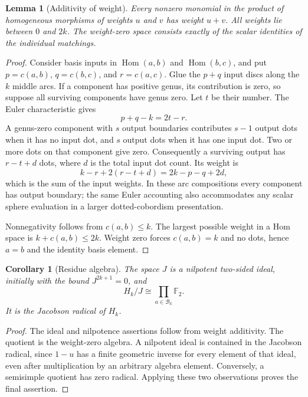 \documentclass[11pt,letterpaper]{article}
\newtheorem{lemma}[theorem]{Lemma}
\newtheorem{corollary}[theorem]{Corollary}
\theoremstyle{definition}
\theoremstyle{remark}
\newcommand{\F}{\mathbb F_2}
\newcommand{\B}{\mathcal B}
\newcommand{\Hom}{\operatorname{Hom}}
\begin{document}
\begin{lemma}[Additivity of weight]\label{lem:weight}
Every nonzero monomial in the product of homogeneous morphisms of weights
$u$ and $v$ has weight $u+v$. All weights lie between $0$ and $2k$.
The weight-zero space consists exactly of the scalar identities of the
individual matchings.
\end{lemma}
\begin{proof}
Consider basis inputs in $\Hom(a,b)$ and $\Hom(b,c)$, and put
$p=c(a,b)$, $q=c(b,c)$, and $r=c(a,c)$. Glue the $p+q$ input discs along the
$k$ middle arcs. If a component has positive genus, its contribution is zero,
so suppose all surviving components have genus zero. Let $t$ be their number.
The Euler characteristic gives
\[
 p+q-k=2t-r.
\]
A genus-zero component with $s$ output boundaries contributes $s-1$ output
dots when it has no input dot, and $s$ output dots when it has one input dot.
Two or more dots on that component give zero. Consequently a surviving output
has $r-t+d$ dots, where $d$ is the total input dot count. Its weight is
\[
 k-r+2(r-t+d)=2k-p-q+2d,
\]
which is the sum of the input weights. In these arc compositions every component
has output boundary; the same Euler accounting also accommodates any scalar
sphere evaluation in a larger dotted-cobordism presentation.

Nonnegativity follows from $c(a,b)\leq k$. The largest possible weight in a Hom
space is $k+c(a,b)\leq2k$. Weight zero forces $c(a,b)=k$ and no dots, hence
$a=b$ and the identity basis element.
\end{proof}

\begin{corollary}[Residue algebra]\label{cor:residue}
The space $J$ is a nilpotent two-sided ideal, initially with the bound
$J^{2k+1}=0$, and
\begin{equation}\label{eq:quotient}
 H_k/J\cong\prod_{a\in\B_k}\F.
\end{equation}
It is the Jacobson radical of $H_k$.
\end{corollary}
\begin{proof}
The ideal and nilpotence assertions follow from weight additivity. The quotient
is the weight-zero algebra. A nilpotent ideal is contained in the Jacobson
radical, since $1-u$ has a finite geometric inverse for every element of that
ideal, even after multiplication by an arbitrary algebra element. Conversely,
a semisimple quotient has zero radical. Applying these two observations proves
the final assertion.
\end{proof}
\end{document}
